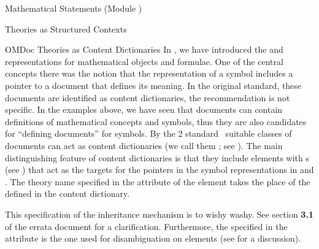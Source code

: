 \begin{tchapter}[id=statements,short=Mathematical Statements]{Mathematical Statements (Module {})}
\begin{tsection}[id=theories]{Theories as Structured Contexts}
\begin{tsubsection}[id=identifying]{OMDoc Theories as Content Dictionaries}
  In {}, we have introduced the {\openmath} and {\cmathml} representations
  for mathematical objects and formulae. One of the central concepts there was the notion
  that the representation of a symbol includes a pointer to a document that defines its
  meaning. In the original {\openmath} standard, these documents are identified as
  {\openmath} content dictionaries, the {\mathml}
  recommendation is not specific. In the examples above, we have seen that {\omdoc}
  documents can contain definitions of mathematical concepts and symbols, thus they are
  also candidates for ``defining documents'' for symbols.  By the {\openmath}2
  standard~\cite{BusCapCar:2oms04} suitable classes of {\omdoc} documents can act as
  {\openmath} content dictionaries (we call them {}; see
  {}).  The main distinguishing feature of {\omdoc} content
  dictionaries is that they include {} elements with
  {s} (see {}) that act as the targets
  for the pointers in the symbol representations in {\openmath} and {\cmathml}. The theory
  name specified in the {} attribute of the
  {} element takes the place of the {} defined in the
  {\openmath} content dictionary.
  
  \begin{erratum}[reported-by=Michael Kohlhase,date=2008-09-25,type=clarification]{This
      specification of the inheritance mechanism is to wishy washy. See section
      {\textbf{3.1}} of the errata document for a clarification.}
    Furthermore, the {} specified in the {}
    attribute is the one used for disambiguation on {} elements
    (see {} for a discussion).
  

\end{erratum}
\end{tsubsection}
\end{tsection}
\end{tchapter}
